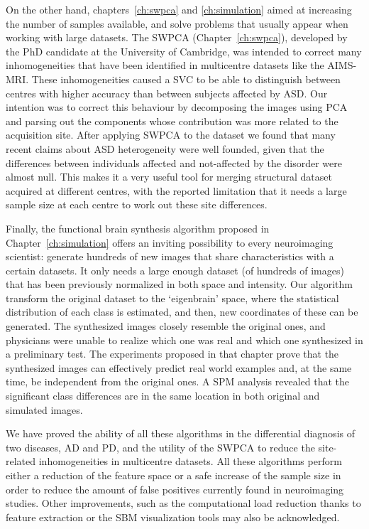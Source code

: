 On the other hand, chapters~\ref{ch:swpca} and \ref{ch:simulation} aimed at increasing the number of samples available, and solve problems that usually appear when working with large datasets. The \ac{SWPCA} (Chapter~\ref{ch:swpca}), developed by the PhD candidate at the University of Cambridge, was intended to correct many inhomogeneities that have been identified in multicentre datasets like the AIMS-MRI. These inhomogeneities caused a \ac{SVC} to be able to distinguish between centres with higher accuracy than between subjects affected by \ac{ASD}. Our intention was to correct this behaviour by decomposing the images using \ac{PCA} and parsing out the components whose contribution was more related to the acquisition site. After applying \ac{SWPCA} to the dataset we found that many recent claims about \ac{ASD} heterogeneity \cite{haar2014anatomical} were well founded, given that the differences between individuals affected and not-affected by the disorder were almost null. This makes it a very useful tool for merging structural dataset acquired at different centres, with the reported limitation that it needs a large sample size at each centre to work out these site differences. 

Finally, the functional brain synthesis algorithm proposed in Chapter~\ref{ch:simulation} offers an inviting possibility to every neuroimaging scientist: generate hundreds of new images that share characteristics with a certain datasets. It only needs a large enough dataset (of hundreds of images) that has been previously normalized in both space and intensity. Our algorithm transform the original dataset to the `eigenbrain' space, where the statistical distribution of each class is estimated, and then, new coordinates of these can be generated. The synthesized images closely resemble the original ones, and physicians were unable to realize which one was real and which one synthesized in a preliminary test. The experiments proposed in that chapter prove that the synthesized images can effectively predict real world examples and, at the same time, be independent from the original ones. A \ac{SPM} analysis revealed that the significant class differences are in the same location in both original and simulated images. 

We have proved the ability of all these algorithms in the differential diagnosis of two diseases, \ac{AD} and \ac{PD}, and the utility of the \ac{SWPCA} to reduce the site-related inhomogeneities in multicentre datasets. All these algorithms perform either a reduction of the feature space or a safe increase of the sample size in order to reduce the amount of false positives currently found in neuroimaging studies. Other improvements, such as the computational load reduction thanks to feature extraction or the \ac{SBM} visualization tools may also be acknowledged. 


